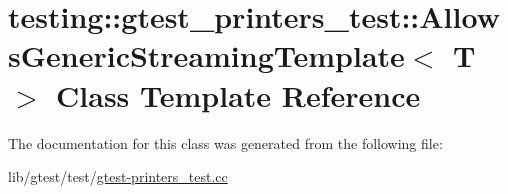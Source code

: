 \hypertarget{classtesting_1_1gtest__printers__test_1_1_allows_generic_streaming_template}{\section{testing\-:\-:gtest\-\_\-printers\-\_\-test\-:\-:Allows\-Generic\-Streaming\-Template$<$ T $>$ Class Template Reference}
\label{classtesting_1_1gtest__printers__test_1_1_allows_generic_streaming_template}
}


The documentation for this class was generated from the following file\-:\begin{DoxyCompactItemize}
\item 
lib/gtest/test/\hyperlink{gtest-printers__test_8cc}{gtest-\/printers\-\_\-test.\-cc}\end{DoxyCompactItemize}
